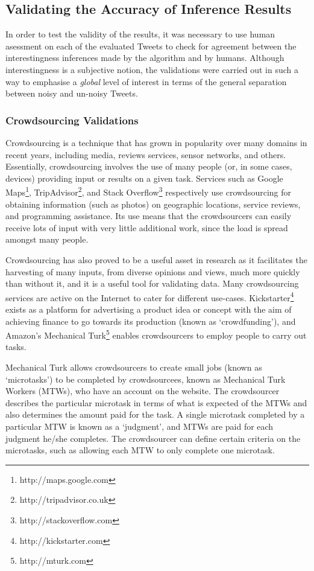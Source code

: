 \subsection{Validating the Accuracy of Inference Results}
In order to test the validity of the results, it was necessary to use human asessment on each of the evaluated Tweets to check for agreement between the interestingness inferences made by the algorithm and by humans. Although interestingness is a subjective notion, the validations were carried out in such a way to emphasise a \textit{global} level of interest in terms of the general separation between noisy and un-noisy Tweets.


\subsubsection{Crowdsourcing Validations}
Crowdsourcing is a technique that has grown in popularity over many domains in recent years, including  media, reviews services, sensor networks, and others. Essentially, crowdsourcing involves the use of many people (or, in some cases, devices) providing input or results on a given task. Services such as Google Maps\footnote{http://maps.google.com}, TripAdvisor\footnote{http://tripadvisor.co.uk}, and Stack Overflow\footnote{http://stackoverflow.com} respectively use crowdsourcing for obtaining information (such as photos) on geographic locations, service reviews, and programming assistance. Its use means that the crowdsourcers can easily receive lots of input with very little additional work, since the load is spread amongst many people.

Crowdsourcing has also proved to be a useful asset in research as it facilitates the harvesting of many inputs, from diverse opinions and views, much more quickly than without it, and it is a useful tool for validating data. Many crowdsourcing services are active on the Internet to cater for different use-cases. Kickstarter\footnote{http://kickstarter.com} exists as a platform for advertising a product idea or concept with the aim of achieving finance to go towards its production (known as `crowdfunding'), and Amazon's Mechanical Turk\footnote{http://mturk.com} enables crowdsourcers to employ people to carry out tasks.

Mechanical Turk allows crowdsourcers to create small jobs (known as `microtasks') to be completed by crowdsourcees, known as Mechanical Turk Workers (MTWs), who have an account on the website. The crowdsourcer describes the particular microtask in terms of what is expected of the MTWs and also determines the amount paid for the task. A single microtask completed by a particular MTW is known as a `judgment', and MTWs are paid for each judgment he/she completes. The crowdsourcer can define certain criteria on the microtasks, such as allowing each MTW to only complete one microtask.

